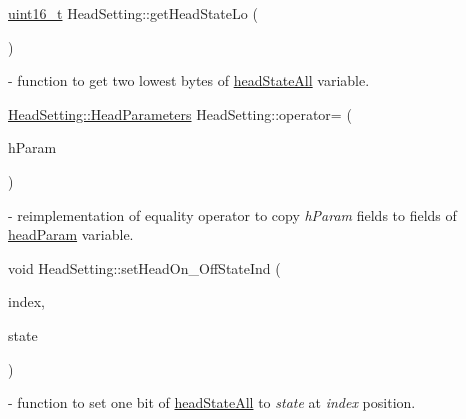 \mbox{\label{classHeadSetting_aefe83a9a9da6123bbe8ccd2df9258e3d}} 
{\footnotesize\ttfamily \mbox{\hyperlink{settings_8h_a017dd44e68049ffdd31500a8cd01ba68}{uint16\+\_\+t}} Head\+Setting\+::\texorpdfstring{get\+Head\+State\+Lo}{getHeadStateLo} (\begin{DoxyParamCaption}{ }\end{DoxyParamCaption}){\ttfamily [static]}}- function to get two lowest bytes of \hyperlink{classHeadSetting_ab80c33d0484f96c53e92ce1842fd0b43}{head\+State\+All} variable.

\mbox{\label{classHeadSetting_a63424c056f596a8d30a10247841056a5}} 
{\footnotesize\ttfamily \mbox{\hyperlink{classHeadSetting_ab604bc48df56fc11dd649357ae7b45b8}{Head\+Setting\+::\+Head\+Parameters}} Head\+Setting\+::\texorpdfstring{operator=}{operator=} (\begin{DoxyParamCaption}\item[{\mbox{\hyperlink{classHeadSetting_ab604bc48df56fc11dd649357ae7b45b8}{Head\+Setting\+::\+Head\+Parameters}}}]{h\+Param }\end{DoxyParamCaption})} - reimplementation of equality operator to copy \textit{h\+Param} fields to fields of \hyperlink{classHeadSetting_a842397f02022fd1d4217afb65beac990}{head\+Param} variable.

\mbox{\label{classHeadSetting_a3559c23ea969b8dd8e42312b95362194}} 
{\footnotesize\ttfamily void Head\+Setting\+::\texorpdfstring{set\+Head\+On\+\_\+\+Off\+State\+Ind}{setHeadOn\_OffStateInd} (\begin{DoxyParamCaption}\item[{\mbox{\hyperlink{settings_8h_a48091a1e52849b0871df2f7081be2e38}{uint8\+\_\+t}}}]{index,  }\item[{bool}]{state }\end{DoxyParamCaption}){\ttfamily [static]}} - function to set one bit of \hyperlink{classHeadSetting_ab80c33d0484f96c53e92ce1842fd0b43}{head\+State\+All} to \textit{state} at \textit{index} position.

